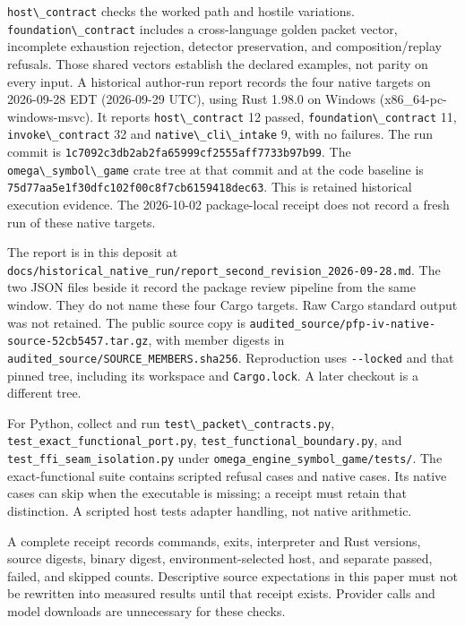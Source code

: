 \documentclass[
  11pt,
]{article}
\newcommand{\passthrough}[1]{#1}
\begin{document}
\passthrough{\lstinline!host\_contract!} checks the worked path and
hostile variations. \passthrough{\lstinline!foundation\_contract!}
includes a cross-language golden packet vector, incomplete exhaustion
rejection, detector preservation, and composition/replay refusals. Those
shared vectors establish the declared examples, not parity on every
input. A historical author-run report records the four native targets on
2026-09-28 EDT (2026-09-29 UTC), using Rust 1.98.0 on Windows
(x86\_64-pc-windows-msvc). It reports
\passthrough{\lstinline!host\_contract!} 12 passed,
\passthrough{\lstinline!foundation\_contract!} 11,
\passthrough{\lstinline!invoke\_contract!} 32 and
\passthrough{\lstinline!native\_cli\_intake!} 9, with no failures. The
run commit is \nolinkurl{1c7092c3db2ab2fa65999cf2555aff7733b97b99}. The
\passthrough{\lstinline!omega\_symbol\_game!} crate tree at that commit
and at the code baseline is
\nolinkurl{75d77aa5e1f30dfc102f00c8f7cb6159418dec63}. This is retained
historical execution evidence. The 2026-10-02 package-local receipt does
not record a fresh run of these native targets.

The report is in this deposit at
\nolinkurl{docs/historical_native_run/report_second_revision_2026-09-28.md}.
The two JSON files beside it record the package review pipeline from the
same window. They do not name these four Cargo targets. Raw Cargo
standard output was not retained. The public source copy is
\nolinkurl{audited_source/pfp-iv-native-source-52cb5457.tar.gz}, with
member digests in \nolinkurl{audited_source/SOURCE_MEMBERS.sha256}.
Reproduction uses \passthrough{\lstinline!--locked!} and that pinned
tree, including its workspace and \passthrough{\lstinline!Cargo.lock!}.
A later checkout is a different tree.

For Python, collect and run
\passthrough{\lstinline!test\_packet\_contracts.py!},
\nolinkurl{test_exact_functional_port.py},
\nolinkurl{test_functional_boundary.py}, and
\nolinkurl{test_ffi_seam_isolation.py} under
\nolinkurl{omega_engine_symbol_game/tests/}. The exact-functional suite
contains scripted refusal cases and native cases. Its native cases can
skip when the executable is missing; a receipt must retain that
distinction. A scripted host tests adapter handling, not native
arithmetic.

A complete receipt records commands, exits, interpreter and Rust
versions, source digests, binary digest, environment-selected host, and
separate passed, failed, and skipped counts. Descriptive source
expectations in this paper must not be rewritten into measured results
until that receipt exists. Provider calls and model downloads are
unnecessary for these checks.
\end{document}
